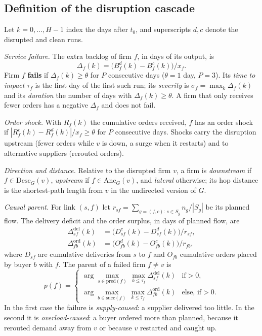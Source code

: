 \documentclass{ifacconf}
\begin{document}
\subsection{Definition of the disruption cascade}
\label{sec:cascade}
Let $k=0,\dots,H-1$ index the days after $t_0$, and superscripts $d,c$ denote the disrupted and clean runs.

\emph{Service failure.} The extra backlog of firm $f$, in days of its output, is
\begin{equation}
\Delta_f(k)=\big(B^{d}_f(k)-B^{c}_f(k)\big)/x_f .
\end{equation}
Firm $f$ \textbf{fails} if $\Delta_f(k)\ge\theta$ for $P$ consecutive days ($\theta=1$ day, $P=3$). Its \emph{time to impact} $\tau_f$ is the first day of the first such run; its \emph{severity} is $\sigma_f=\max_k\Delta_f(k)$ and its \emph{duration} the number of days with $\Delta_f(k)\ge\theta$. A firm that only receives fewer orders has a negative $\Delta_f$ and does not fail.

\emph{Order shock.} With $R_f(k)$ the cumulative orders received, $f$ has an order shock if $|R^{c}_f(k)-R^{d}_f(k)|/x_f\ge\theta$ for $P$ consecutive days. Shocks carry the disruption upstream (fewer orders while $v$ is down, a surge when it restarts) and to alternative suppliers (rerouted orders).

\emph{Direction and distance.} Relative to the disrupted firm $v$, a firm is \emph{downstream} if $f\in\mathrm{Desc}_G(v)$, \emph{upstream} if $f\in\mathrm{Anc}_G(v)$, and \emph{lateral} otherwise; its hop distance is the shortest-path length from $v$ in the undirected version of $G$.

\emph{Causal parent.} For link $(s,f)$ let $r_{sf}=\sum_{g=(f,c):\,s\in S_g}n_g/|S_g|$ be its planned flow. The delivery deficit and the order surplus, in days of planned flow, are
\begin{align}
\Delta^{\mathrm{del}}_{sf}(k)&=\big(D^{c}_{sf}(k)-D^{d}_{sf}(k)\big)/r_{sf},\\
\Delta^{\mathrm{ord}}_{fb}(k)&=\big(O^{d}_{fb}(k)-O^{c}_{fb}(k)\big)/r_{fb},
\end{align}
where $D_{sf}$ are cumulative deliveries from $s$ to $f$ and $O_{fb}$ cumulative orders placed by buyer $b$ with $f$. The parent of a failed firm $f\neq v$ is
\begin{equation}
p(f)=\begin{cases}
\arg\max_{s\in\mathrm{pred}(f)}\,\max_{k\le\tau_f}\Delta^{\mathrm{del}}_{sf}(k) & \text{if}>0,\\[2pt]
\arg\max_{b\in\mathrm{succ}(f)}\,\max_{k\le\tau_f}\Delta^{\mathrm{ord}}_{fb}(k) & \text{else, if}>0.
\end{cases}
\end{equation}
In the first case the failure is \emph{supply-caused}: a supplier delivered too little. In the second it is \emph{overload-caused}: a buyer ordered more than planned, because it rerouted demand away from $v$ or because $v$ restarted and caught up.
\end{document}
